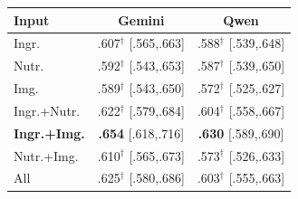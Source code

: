 \begin{center}
\label{tab:ablation-llm}
\footnotesize
\setlength{\tabcolsep}{4pt}
\renewcommand{\arraystretch}{0.95}
\begin{tabular}{@{}lcc@{}}
\toprule
Input & Gemini & Qwen \\
\midrule
Ingr. & .607$^\dag$ [.565,.663] & .588$^\dag$ [.539,.648] \\
Nutr. & .592$^\dag$ [.543,.653] & .587$^\dag$ [.539,.650] \\
Img. & .589$^\dag$ [.543,.650] & .572$^\dag$ [.525,.627] \\
Ingr.+Nutr. & .622$^\dag$ [.579,.684] & .604$^\dag$ [.558,.667] \\
\textbf{Ingr.+Img.} & \textbf{.654} [.618,.716] & \textbf{.630} [.589,.690] \\
Nutr.+Img. & .610$^\dag$ [.565,.673] & .573$^\dag$ [.526,.633] \\
All & .625$^\dag$ [.580,.686] & .603$^\dag$ [.555,.663] \\
\bottomrule
\end{tabular}
\end{center}
